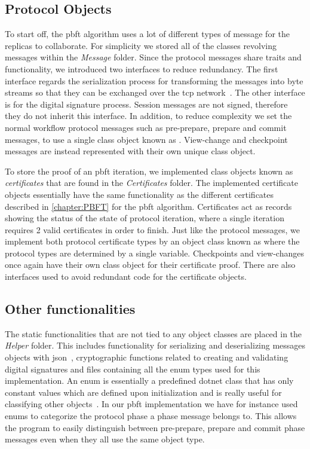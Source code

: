 
\subsection{Protocol Objects}
To start off, the \ac{pbft} algorithm uses a lot of different types of message for the replicas to collaborate. For simplicity we stored all of the classes revolving messages within the \emph{Message} folder. Since the protocol messages share traits and functionality, we introduced two interfaces to reduce redundancy. The first interface regards the serialization process for transforming the messages into byte streams so that they can be exchanged over the \ac{tcp} network~\cite{WEB:tcp}. The other interface is for the digital signature process. Session messages are not signed, therefore they do not inherit this interface. In addition, to reduce complexity we set the normal workflow protocol messages such as pre-prepare, prepare and commit messages, to use a single class object known as . View-change and checkpoint messages are instead represented with their own unique class object.

To store the proof of an \ac{pbft} iteration, we implemented class objects known as \emph{certificates} that are found in the \emph{Certificates} folder. The implemented certificate objects essentially have the same functionality as the different certificates described in \autoref{chapter:PBFT} for the \ac{pbft} algorithm. Certificates act as records showing the status of the state of protocol iteration, where a single iteration requires 2 valid certificates in order to finish. Just like the protocol messages, we implement both protocol certificate types by an object class known as  where the protocol types are determined by a single variable. Checkpoints and view-changes once again have their own class object for their certificate proof. There are also interfaces used to avoid redundant code for the certificate objects.

\subsection{Other functionalities}
The static functionalities that are not tied to any object classes are placed in the \emph{Helper} folder. This includes functionality for serializing and deserializing messages objects with \ac{json}~\cite{WEB:NewJSON}, cryptographic functions related to creating and validating digital signatures and files containing all the enum types used for this implementation. An enum is essentially a predefined dotnet class that has only constant values which are defined upon initialization and is really useful for classifying other objects~\cite{WEB:Enum}. In our \ac{pbft} implementation we have for instance used enums to categorize the protocol phase a phase message belongs to. This allows the program to easily distinguish between pre-prepare, prepare and commit phase messages even when they all use the same object type.

